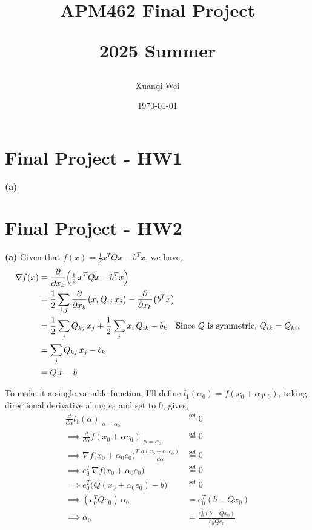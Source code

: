 \documentclass[12pt]{article}
\title{APM462 Final Project \\
\begin{large} 
  2025 Summer
\end{large} 
}
\author{Xuanqi Wei}
\date{\today}
\begin{document}
\maketitle
\thispagestyle{empty}

\newpage

\tableofcontents
\thispagestyle{empty}

\newpage

\setcounter{page}{1}

\section{Final Project - HW1}
\textbf{(a)} 

\newpage

\section{Final Project - HW2}
\textbf{(a)}
Given that $f(x)=\frac{1}{2}x^TQx-b^Tx$, we have, 
\begin{align*}
    \nabla f(x) &=  \frac{\partial}{\partial x_k}\Bigl(\tfrac12\,x^TQx-b^T x\Bigr) \\
    &= \frac12\sum_{i,j}\frac{\partial}{\partial x_k}\bigl(x_i\,Q_{ij}\,x_j\bigr) - \frac{\partial}{\partial x_k}\bigl(b^T x\bigr) \\
    &=\frac12\sum_{j}Q_{kj}\,x_j+\frac12\sum_{i}x_i\,Q_{ik} -b_k  \quad \text{Since $Q$ is symmetric, $Q_{ik}=Q_{ki}$,} \\
    &= \sum_{j}Q_{kj}\,x_j - b_k  \\
    &= Q\,x - b
\end{align*}

To make it a single variable function, I'll define $l_1(\alpha_0) = f(x_0+\alpha_0e_0)$, taking directional derivative along $e_0$ and set to 0, gives, 
\begin{align*}
	\frac{d}{d\alpha}l_1(\alpha)\Big|_{\alpha=\alpha_0} &\overset{\text{set}}{=} 0 \\
	\implies \frac{d}{d\alpha}f(x_0+\alpha e_0)\Big|_{\alpha=\alpha_0} &\overset{\text{set}}{=} 0 \\
	\implies \nabla f\big(x_0+\alpha_0 e_0\big)^{\!T}\,\frac{d(x_0+\alpha_0 e_0)}{d\alpha} &\overset{\text{set}}{=} 0 \\
	\implies e_0^{T}\,\nabla f\big(x_0+\alpha_0 e_0\big) &\overset{\text{set}}{=} 0 \\
	\implies e_0^T\big(Q(x_0+\alpha_0 e_0)-b\big) &\overset{\text{set}}{=} 0 \\
	\implies (e_0^TQe_0)\,\alpha_0 &= e_0^T(b-Qx_0) \\
	\implies \alpha_0 &= \frac{e_0^T(b-Qx_0)}{e_0^TQe_0}
\end{align*}
\end{document}

